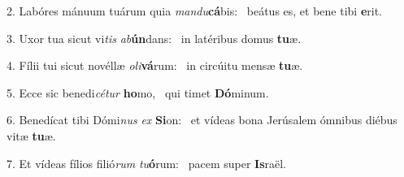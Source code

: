 2. Labóres mánuum tuárum quia \textit{man}\textit{du}\textbf{cá}bis: \ast\  beátus es, et bene tibi \textbf{e}rit.\

3. Uxor tua sicut vi\textit{tis} \textit{ab}\textbf{ún}dans: \ast\  in latéribus domus \textbf{tu}æ.\

4. Fílii tui sicut novéllæ \textit{o}\textit{li}\textbf{vá}rum: \ast\  in circúitu mensæ \textbf{tu}æ.\

5. Ecce sic benedi\textit{cé}\textit{tur} \textbf{ho}mo, \ast\  qui timet \textbf{Dó}minum.\

6. Benedícat tibi Dómi\textit{nus} \textit{ex} \textbf{Si}on: \ast\  et vídeas bona Jerúsalem ómnibus diébus vitæ \textbf{tu}æ.\

7. Et vídeas fílios filió\textit{rum} \textit{tu}\textbf{ó}rum: \ast\  pacem super \textbf{Is}raël.\

